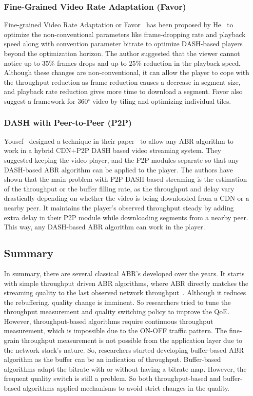 \subsubsection{Fine-Grained Video Rate Adaptation (Favor)}
Fine-grained Video Rate Adaptation or Favor~\cite{10.1145/3204949.3204957} has been proposed by He \etal\ to optimize the non-conventional parameters like frame-dropping rate and playback speed along with convention parameter bitrate to optimize DASH-based players beyond the optimization horizon. The author suggested that the viewer cannot notice up to 35\% frames drops and up to 25\% reduction in the playback speed. Although these changes are non-conventional, it can allow the player to cope with the throughput reduction as frame reduction causes a decrease in segment size, and playback rate reduction gives more time to download a segment. Favor also suggest a framework for 360$^{\circ}$ video by tiling and optimizing individual tiles.

\subsubsection{DASH with Peer-to-Peer (P2P)}
Yousef \etal\ designed a technique in their paper~\cite{10.1145/3339825.3391859} to allow any ABR algorithm to work in a hybrid CDN+P2P DASH based video streaming system. They suggested keeping the video player, and the P2P modules separate so that any DASH-based ABR algorithm can be applied to the player. The authors have shown that the main problem with P2P DASH-based streaming is the estimation of the throughput or the buffer filling rate, as the throughput and delay vary drastically depending on whether the video is being downloaded from a CDN or a nearby peer. It maintains the player's observed throughput steady by adding extra delay in their P2P module while downloading segments from a nearby peer. This way, any DASH-based ABR algorithm can work in the player.

\subsection{Summary}
In summary, there are several classical ABR's developed over the years. It starts with simple throughput driven ABR algorithms, where ABR directly matches the streaming quality to the last observed network throughput~\cite{5677508,10.1145/1943552.1943575,10.1145/1943552.1943574}. Although it reduces the rebuffering, quality change is imminent. So researchers tried to tune the throughput measurement and quality switching policy to improve the QoE. However, throughput-based algorithms require continuous throughput measurement, which is impossible due to the ON-OFF traffic pattern. The fine-grain throughput measurement is not possible from the application layer due to the network stack's nature. So, researchers started developing buffer-based ABR algorithm as the buffer can be an indication of throughput. Buffer-based algorithms adapt the bitrate with or without having a bitrate map. However, the frequent quality switch is still a problem. So both throughput-based and buffer-based algorithms applied mechanisms to avoid strict changes in the quality.

